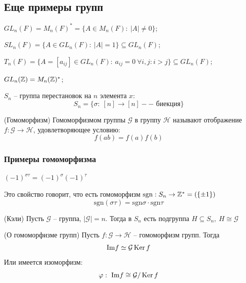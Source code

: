 \begin{multicols}{2}
\subsection*{Еще примеры групп}
\begin{enumerate*}
    \item $GL_n(F) = M_n(F)^* = \{A \in M_n (F): \ |A| \neq 0\}$;
    \item $SL_n(F) = \{A \in GL_n(F):\ |A| = 1\} \subseteq GL_n(F)$;
    \item $T_n(F) = \{A = [a_{ij}] \in GL_n(F): \ a_{ij} = 0 \ \forall i,j: i>j\} \subseteq GL_n(F)$;
    \item $GL_n(\mathbb{Z}) = M_n(\mathbb{Z})^*$;
    \item $S_n$ -- группа перестановок на $n$ элемента $x$:
    \[
        S_n = \{\sigma: \ [n] \to [n] -- \text{ биекция}\}
        \]
\end{enumerate*}
\begin{definition}{(Гомоморфизм)}{}
    Гомоморфизмом группы $\mathcal{G}$ в группу $\mathcal{H}$ называют отображение $f: \mathcal{G} \to \mathcal{H}$, удовлетворяющее условию:\useshortskip
    \[f(ab) = f(a)f(b)\]
\end{definition}
\subsubsection*{Примеры гомоморфизма}
\begin{enumerate*}
    \item $(-1)^{\sigma\tau} = (-1)^\sigma (-1)^\tau$
    \par Это свойство говорит, что есть гомоморфизм $\mathrm{sgn}: S_n \to \mathbb{Z}^* = \left(\{\pm 1\}\right)$
    \[
        \mathrm{sgn} (\sigma \tau) = \mathrm{sgn}\sigma \cdot \mathrm{sgn} \tau
        \]
\end{enumerate*}
\begin{theorema}{(Кэли)}{}
    Пусть $\mathcal{G}$ -- группа, $|\mathcal{G}| = n$. Тогда в $S_n$ есть подгруппа $H \subseteq S_n, \ H \cong \mathcal{G}$
\end{theorema}
\begin{theorema}{(О гомоморфизме групп)}{}
    Пусть $f: \mathcal{G} \to \mathcal{H}$ -- гомоморфизм групп. Тогда\useshortskip
    \[\mathrm{Im} f \simeq \mathcal{G}\operatorname{Ker} f\] 
    Или имеется изоморфизм:\useshortskip
    \[\varphi: \ \mathrm{Im} f \cong \mathcal{G}/\operatorname{Ker} f\]
\end{theorema}

\end{multicols}
